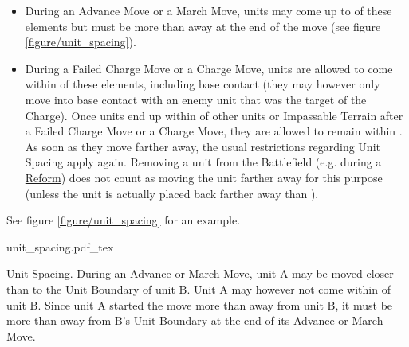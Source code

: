 \begin{itemize}
	\item During an Advance Move or a March Move, units may come up to  of these elements but must be more than  away at the end of the move (see figure \ref{figure/unit_spacing}).
	\item During a Failed Charge Move or a Charge Move, units are allowed to come within  of these elements, including base contact (they may however only move into base contact with an enemy unit that was the target of the Charge).\newline
	Once  units  end up within  of other units or Impassable Terrain after a Failed Charge Move or a Charge Move, they are allowed to remain  within . As soon as they move farther away, the usual restrictions regarding Unit Spacing apply again. Removing a unit from the Battlefield (e.g. during a \hyperref[reform]{Reform}) does not count as moving the unit farther away for this purpose (unless the unit is actually placed back farther away than ).
\end{itemize}

See figure \ref{figure/unit_spacing} for an example.

\begin{Figure}
	\centering
	\Fanchor
	\def\svgwidth{0.91\textwidth}
	{unit_spacing.pdf_tex}
	\caption{Unit Spacing.\captionposttitle
		During an Advance or March Move, unit A may be moved closer than  to the Unit Boundary of unit B. Unit A may however not come within  of unit B. Since unit A started the move more than  away from unit B, it must be more than  away from B's Unit Boundary at the end of its Advance or March Move.}
	\label{figure/unit_spacing}
\end{Figure}

\RBemc
